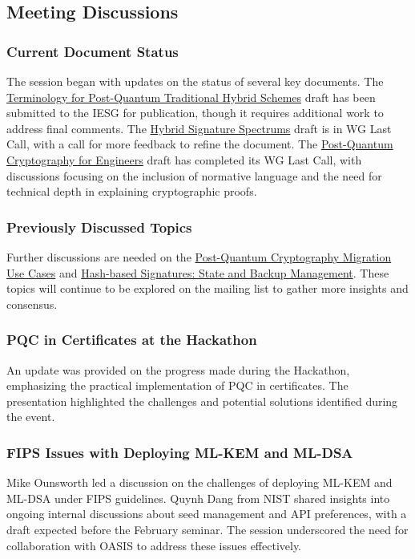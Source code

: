 \documentclass{article}
\begin{document}
\subsection{Meeting Discussions}

\subsubsection{Current Document Status}
The session began with updates on the status of several key documents. The \href{https://datatracker.ietf.org/doc/html/draft-ietf-pquip-pqt-hybrid-terminology}{Terminology for Post-Quantum Traditional Hybrid Schemes} draft has been submitted to the IESG for publication, though it requires additional work to address final comments. The \href{https://datatracker.ietf.org/doc/html/draft-ietf-pquip-hybrid-signature-spectrums}{Hybrid Signature Spectrums} draft is in WG Last Call, with a call for more feedback to refine the document. The \href{https://datatracker.ietf.org/doc/html/draft-ietf-pquip-pqc-engineers}{Post-Quantum Cryptography for Engineers} draft has completed its WG Last Call, with discussions focusing on the inclusion of normative language and the need for technical depth in explaining cryptographic proofs.

\subsubsection{Previously Discussed Topics}
Further discussions are needed on the \href{https://datatracker.ietf.org/doc/html/draft-vaira-pquip-pqc-use-cases}{Post-Quantum Cryptography Migration Use Cases} and \href{https://datatracker.ietf.org/doc/html/draft-wiggers-hbs-state}{Hash-based Signatures: State and Backup Management}. These topics will continue to be explored on the mailing list to gather more insights and consensus.

\subsubsection{PQC in Certificates at the Hackathon}
An update was provided on the progress made during the Hackathon, emphasizing the practical implementation of PQC in certificates. The presentation highlighted the challenges and potential solutions identified during the event.

\subsubsection{FIPS Issues with Deploying ML-KEM and ML-DSA}
Mike Ounsworth led a discussion on the challenges of deploying ML-KEM and ML-DSA under FIPS guidelines. Quynh Dang from NIST shared insights into ongoing internal discussions about seed management and API preferences, with a draft expected before the February seminar. The session underscored the need for collaboration with OASIS to address these issues effectively.
\end{document}
